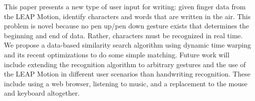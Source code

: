 This paper presents a new type of user input for writing: given finger data from the LEAP Motion, identify characters and words that are written in the air. This problem is novel because no pen up/pen down gesture exists that determines the beginning and end of data. Rather, characters must be recognized in real time. We propose a data-based similarity search algorithm using dynamic time warping and its recent optimizations to do some simple matching. Future work will include extending the recognition algorithm to arbitrary gestures and the use of the LEAP Motion in different user scenarios than handwriting recognition. These include using a web browser, listening to music, and a replacement to the mouse and keyboard altogether.
